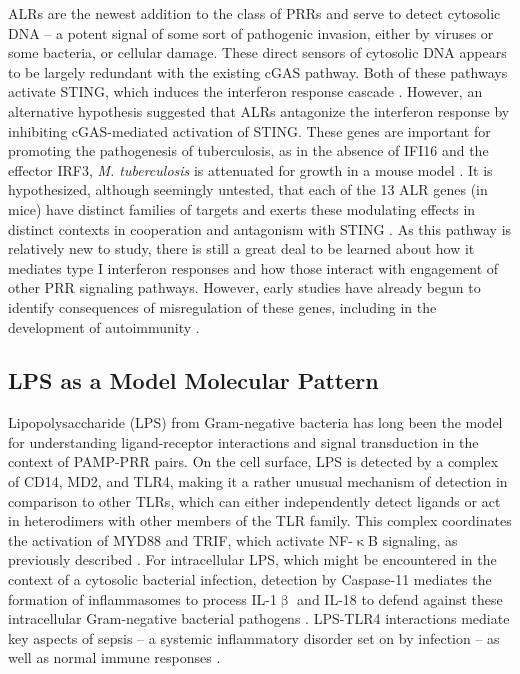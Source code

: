 ALRs are the newest addition to the class of PRRs and serve to detect cytosolic DNA -- a potent signal of some sort of pathogenic invasion, either by viruses or some bacteria, or cellular damage. These direct sensors of cytosolic DNA appears to be largely redundant with the existing cGAS pathway. Both of these pathways activate STING, which induces the interferon response cascade \citep{Gray2016}. However, an alternative hypothesis suggested that ALRs antagonize the interferon response by inhibiting cGAS\hyp{}mediated activation of STING. These genes are important for promoting the pathogenesis of tuberculosis, as in the absence of IFI16 and the effector IRF3, \textit{M. tuberculosis} is attenuated for growth in a mouse model \citep{Manzanillo2012}. It is hypothesized, although seemingly untested, that each of the 13 ALR genes (in mice) have distinct families of targets and exerts these modulating effects in distinct contexts in cooperation and antagonism with STING \citep{Nakaya2017}. As this pathway is relatively new to study, there is still a great deal to be learned about how it mediates type I interferon responses and how those interact with engagement of other PRR signaling pathways. However, early studies have already begun to identify consequences of misregulation of these genes, including in the development of autoimmunity \citep{Caneparo2018}.

\subsection{LPS as a Model Molecular Pattern}\label{lps}

Lipopolysaccharide (LPS) from Gram\hyp{}negative bacteria has long been the model for understanding ligand\hyp{}receptor interactions and signal transduction in the context of PAMP\hyp{}PRR pairs. On the cell surface, LPS is detected by a complex of CD14, MD2, and TLR4, making it a rather unusual mechanism of detection in comparison to other TLRs, which can either independently detect ligands or act in heterodimers with other members of the TLR family. This complex coordinates the activation of MYD88 and TRIF, which activate NF\hyp{}$\upkappa$B signaling, as previously described \citep{Miller2005, Beutler2000}. For intracellular LPS, which might be encountered in the context of a cytosolic bacterial infection, detection by Caspase\hyp{}11 mediates the formation of inflammasomes to process IL\hyp{}1$\upbeta$ and IL\hyp{}18 to defend against these intracellular Gram\hyp{}negative bacterial pathogens \citep{Wright1990, Triantafilou2002, Kawai1999, Vasudevan2022, Kayagaki2013, Rathinam2019, Shi2014}. LPS\hyp{}TLR4 interactions mediate key aspects of sepsis -- a systemic inflammatory disorder set on by infection -- as well as normal immune responses \citep{Freudenberg2008}.

